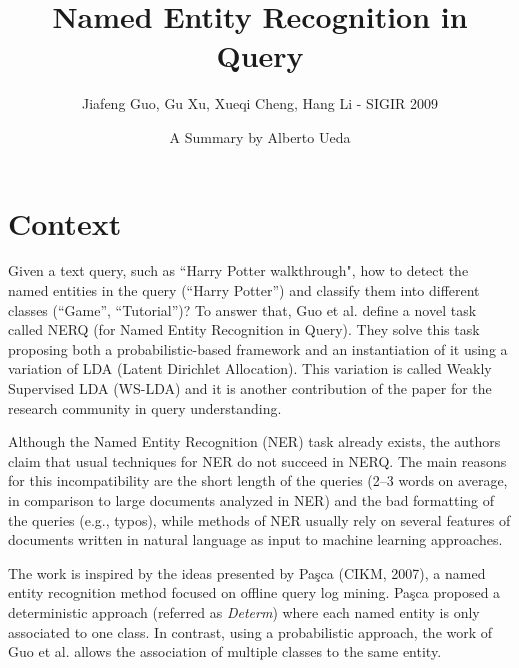 \documentclass[sigconf]{acmart} %
\begin{document}
\title{Named Entity Recognition in Query}
\subtitle{Jiafeng Guo, Gu Xu, Xueqi Cheng, Hang Li - SIGIR 2009}

\author{A Summary by Alberto Ueda}

\maketitle

\section{Context}

Given a text query, such as ``Harry Potter walkthrough", how to detect the named entities in the query (``Harry Potter'') and classify them into different classes (``Game'', ``Tutorial'')? To answer that, Guo et al. define a novel task called NERQ (for Named Entity Recognition in Query). They solve this task proposing both a probabilistic-based framework and an instantiation of it using a variation of LDA (Latent Dirichlet Allocation). This variation is called Weakly Supervised LDA (WS-LDA) and it is another contribution of the paper for the research community in query understanding.

Although the Named Entity Recognition (NER) task already exists, the authors claim that usual techniques for NER do not succeed in NERQ. The main reasons for this incompatibility are the short length of the queries (2--3 words on average, in comparison to large documents analyzed in NER) and the bad formatting of the queries (e.g., typos), while methods of NER usually rely on several features of documents written in natural language as input to machine learning approaches.

The work is inspired by the ideas presented by Paşca (CIKM, 2007), a named entity recognition method focused on offline query log mining. Paşca proposed a deterministic approach (referred as \textit{Determ}) where each named entity is only associated to one class. In contrast, using a probabilistic approach, the work of Guo et al. allows the association of multiple classes to the same entity.

\end{document}
